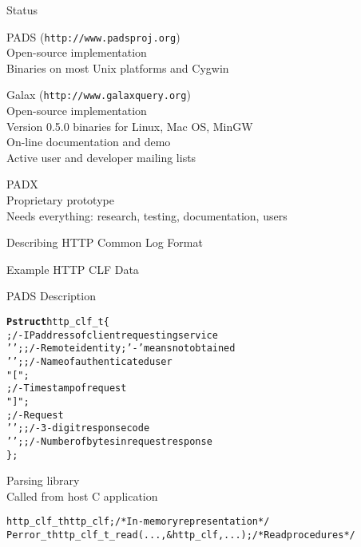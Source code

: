 \documentclass[landscape]{slides}
\newcommand{\bftt}[1]{{\ttfamily\bfseries{}#1}}
\newcommand{\kw}[1]{{\bftt{#1}}}
\begin{document}
\begin{Slide}{Status}

  \bb PADS (\texttt{http://www.padsproj.org})\\
  \bbb Open-source implementation \\
  \bbb Binaries on most Unix platforms and Cygwin

  \bb Galax (\texttt{http://www.galaxquery.org})\\
  \bbb Open-source implementation \\
  \bbb Version 0.5.0 binaries for Linux, Mac OS, MinGW\\
  \bbb On-line documentation and demo\\
  \bbb Active user and developer mailing lists 

  \bb PADX\\
  \bbb Proprietary prototype\\
  \bbb Needs everything: research, testing, documentation, users

\end{Slide}

\begin{Slide}{Describing HTTP Common Log Format}

  \bb Example HTTP CLF Data

{\small
\begin{alltt}
\end{alltt}
}
  \bb PADS Description

{\small
\begin{alltt}
\kw{Pstruct} http_clf_t \{
         ;              /- IP address of client requesting service
   ' ';  ;          /- Remote identity; '-' means not obtained
   ' ';  ;              /- Name of authenticated user
   " [";
   \darkgreen{Pdate(:']':)} ;             /- Timestamp of request
   "] ";
    ;           /- Request
   ' ';   ;   /- 3-digit response code
   ' ';   ; /- Number of bytes in request response
\};
\end{alltt}}

\bb Parsing library \\
\bbb Called from host C application

{\small
\begin{alltt}
  http_clf_t http_clf;        /* In-memory representation */
  Perror_t http_clf_t_read(..., &http_clf, ...); /* Read procedures */
\end{alltt}}


\end{Slide}
\end{document}
